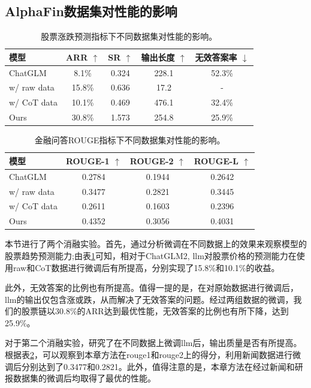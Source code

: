 \subsection{AlphaFin数据集对性能的影响}

\begin{table}
	\caption{\label{dataset_ablation_trend}股票涨跌预测指标下不同数据集对性能的影响。}
	\centering{}%
	\small 
	\begin{tabular}{lcccc}
		\toprule[2pt]
		模型 & ARR $\uparrow$ & SR $\uparrow$ & 输出长度 $\uparrow$ & 无效答案率 $\downarrow$ \\
		\hline
		ChatGLM & 8.1\% & 0.324 & 228.1 & 52.3\% \\
		w/ raw data & 15.8\% & 0.636 & 17.2 & - \\
		w/ CoT data & 10.1\% & 0.469 & 476.1 & 32.4\% \\
		Ours & 30.8\% & 1.573 & 254.8 & 25.9\% \\
		\bottomrule[2pt]
	\end{tabular}
\end{table}

\begin{table}
	\caption{\label{dataset_ablation_qa}金融问答ROUGE指标下不同数据集对性能的影响。}
	\centering{}%
	\small 
	\begin{tabular}{lccc}
		\toprule[2pt]
		模型 & ROUGE-1 $\uparrow$ & ROUGE-2 $\uparrow$ & ROUGE-L $\uparrow$ \\
		\hline
		ChatGLM & 0.2784 & 0.1944 & 0.2642 \\
		w/ raw data & 0.3477 & 0.2821 & 0.3445 \\
		w/ CoT data & 0.2611 & 0.1603 & 0.2396 \\
		Ours & 0.4352 & 0.3056 & 0.4031 \\
		\bottomrule[2pt]
	\end{tabular}
\end{table}

本节进行了两个消融实验。首先，通过分析微调在不同数据上的效果来观察模型的股票趋势预测能力;由表\ref{dataset_ablation_trend}可知，相对于ChatGLM2, llm对股票价格的预测能力在使用raw和CoT数据进行微调后有所提高，分别实现了15.8\%和10.1\%的收益。 

此外，无效答案的比例也有所提高。值得一提的是，在对原始数据进行微调后，llm的输出仅包含涨或跌，从而解决了无效答案的问题。经过两组数据的微调，我们的股票链以30.8\%的ARR达到最优性能，无效答案的比例也有所下降，达到25.9\%。

对于第二个消融实验，研究了在不同数据上微调llm后，输出质量是否有所提高。根据表\ref{dataset_ablation_qa}，可以观察到本章方法在rouge1和rouge2上的得分，利用新闻数据进行微调后分别达到了0.3477和0.2821。此外，值得注意的是，本章方法在经过新闻和研报数据集的微调后均取得了最优的性能。

